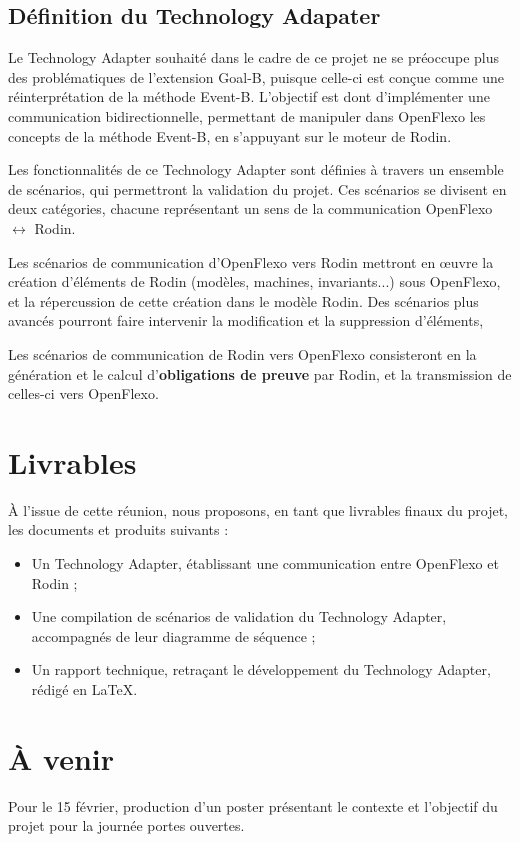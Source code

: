 \documentclass{article}
\begin{document}
\subsection*{Définition du Technology Adapater}
Le Technology Adapter souhaité dans le cadre de ce projet ne se préoccupe plus des problématiques de l'extension Goal-B, puisque celle-ci est conçue comme une réinterprétation de la méthode Event-B.
L'objectif est dont d'implémenter une communication bidirectionnelle, permettant de manipuler dans OpenFlexo les concepts de la méthode Event-B, en s'appuyant sur le moteur de Rodin.

Les fonctionnalités de ce Technology Adapter sont définies à travers un ensemble de scénarios, qui permettront la validation du projet.
Ces scénarios se divisent en deux catégories, chacune représentant un sens de la communication OpenFlexo \(\leftrightarrow\) Rodin.

Les scénarios de communication d'OpenFlexo vers Rodin mettront en œuvre la création d'éléments de Rodin (modèles, machines, invariants...) sous OpenFlexo, et la répercussion %
de cette création dans le modèle Rodin.
Des scénarios plus avancés pourront faire intervenir la modification et la suppression d'éléments,

Les scénarios de communication de Rodin vers OpenFlexo consisteront en la génération et le calcul d'\textbf{obligations de preuve} par Rodin, et la transmission de celles-ci vers OpenFlexo.


\section*{Livrables}
À l'issue de cette réunion, nous proposons, en tant que livrables finaux du projet, les documents et produits suivants :

\begin{itemize}
    \item Un Technology Adapter, établissant une communication entre OpenFlexo et Rodin ;
    \item Une compilation de scénarios de validation du Technology Adapter, accompagnés de leur diagramme de séquence ;
    \item Un rapport technique, retraçant le développement du Technology Adapter, rédigé en \LaTeX.
\end{itemize}


\section*{À venir}
Pour le 15 février, production d'un poster présentant le contexte et l'objectif du projet pour la journée portes ouvertes.
\end{document}
